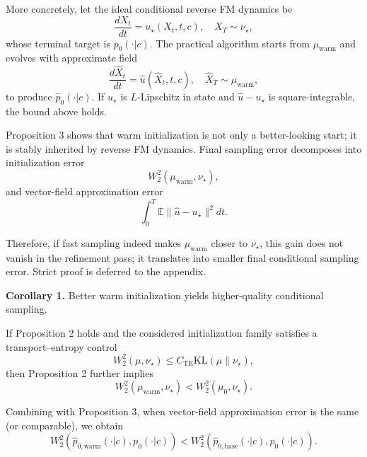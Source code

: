 \documentclass[letterpaper]{article} %
\begin{document}
More concretely, let the ideal conditional reverse FM dynamics be
\begin{equation}
\frac{dX_t}{dt}=u_\star(X_t,t,c), \quad X_T\sim\nu_\star,
\end{equation}
whose terminal target is $p_0(\cdot|c)$. The practical algorithm starts from $\mu_{\mathrm{warm}}$ and evolves with approximate field
\begin{equation}
\frac{d\hat X_t}{dt}=\hat u(\hat X_t,t,c), \quad \hat X_T\sim\mu_{\mathrm{warm}},
\end{equation}
to produce $\hat p_0(\cdot|c)$. If $u_\star$ is $L$-Lipschitz in state and $\hat u-u_\star$ is square-integrable, the bound above holds.

Proposition 3 shows that warm initialization is not only a better-looking start; it is stably inherited by reverse FM dynamics. Final sampling error decomposes into initialization error
\begin{equation}
W_2^2(\mu_{\mathrm{warm}},\nu_\star),
\end{equation}
and vector-field approximation error
\begin{equation}
\int_0^T\mathbb E\|\hat u-u_\star\|^2dt.
\end{equation}

Therefore, if fast sampling indeed makes $\mu_{\mathrm{warm}}$ closer to $\nu_\star$, this gain does not vanish in the refinement pass; it translates into smaller final conditional sampling error. Strict proof is deferred to the appendix.

\textbf{Corollary 1.} Better warm initialization yields higher-quality conditional sampling.

If Proposition 2 holds and the considered initialization family satisfies a transport--entropy control
\begin{equation}
W_2^2(\mu,\nu_\star)\le C_{\mathrm{TE}}\mathrm{KL}(\mu\|\nu_\star),
\end{equation}
then Proposition 2 further implies
\begin{equation}
W_2^2(\mu_{\mathrm{warm}},\nu_\star)<W_2^2(\mu_0,\nu_\star).
\end{equation}

Combining with Proposition 3, when vector-field approximation error is the same (or comparable), we obtain
\begin{equation}
W_2^2\!\left(\hat p_{0,\mathrm{warm}}(\cdot|c),p_0(\cdot|c)\right)
<W_2^2\!\left(\hat p_{0,\mathrm{base}}(\cdot|c),p_0(\cdot|c)\right).
\end{equation}
\end{document}
